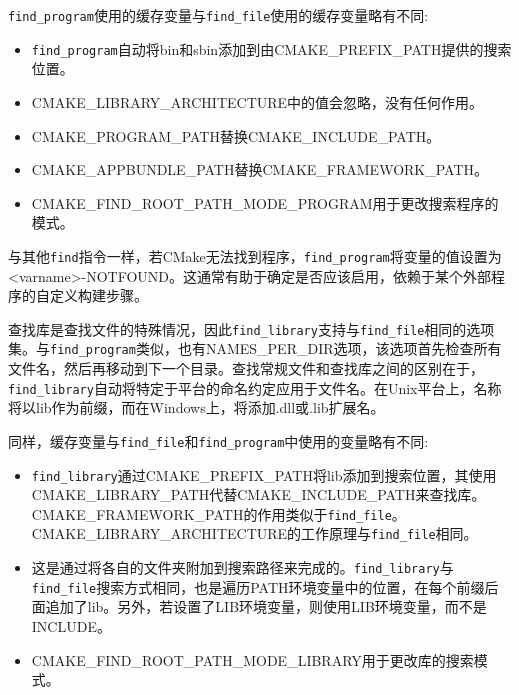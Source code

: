\texttt{find\_program}使用的缓存变量与\texttt{find\_file}使用的缓存变量略有不同:

\begin{itemize}
\item 
\texttt{find\_program}自动将bin和sbin添加到由CMAKE\_PREFIX\_PATH提供的搜索位置。

\item 
CMAKE\_LIBRARY\_ARCHITECTURE中的值会忽略，没有任何作用。

\item 
CMAKE\_PROGRAM\_PATH替换CMAKE\_INCLUDE\_PATH。

\item 
CMAKE\_APPBUNDLE\_PATH替换CMAKE\_FRAMEWORK\_PATH。

\item 
CMAKE\_FIND\_ROOT\_PATH\_MODE\_PROGRAM用于更改搜索程序的模式。
\end{itemize}

与其他\texttt{find}指令一样，若CMake无法找到程序，\texttt{find\_program}将变量的值设置为<varname>-NOTFOUND。这通常有助于确定是否应该启用，依赖于某个外部程序的自定义构建步骤。


查找库是查找文件的特殊情况，因此\texttt{find\_library}支持与\texttt{find\_file}相同的选项集。与\texttt{find\_program}类似，也有NAMES\_PER\_DIR选项，该选项首先检查所有文件名，然后再移动到下一个目录。查找常规文件和查找库之间的区别在于，\texttt{find\_library}自动将特定于平台的命名约定应用于文件名。在Unix平台上，名称将以lib作为前缀，而在Windows上，将添加.dll或.lib扩展名。

同样，缓存变量与\texttt{find\_file}和\texttt{find\_program}中使用的变量略有不同:

\begin{itemize}
\item 
\texttt{find\_library}通过CMAKE\_PREFIX\_PATH将lib添加到搜索位置，其使用CMAKE\_LIBRARY\_PATH代替CMAKE\_INCLUDE\_PATH来查找库。CMAKE\_FRAMEWORK\_PATH的作用类似于\texttt{find\_file}。CMAKE\_LIBRARY\_ARCHITECTURE的工作原理与\texttt{find\_file}相同。

\item 
这是通过将各自的文件夹附加到搜索路径来完成的。\texttt{find\_library}与\texttt{find\_file}搜索方式相同，也是遍历PATH环境变量中的位置，在每个前缀后面追加了lib。另外，若设置了LIB环境变量，则使用LIB环境变量，而不是INCLUDE。

\item 
CMAKE\_FIND\_ROOT\_PATH\_MODE\_LIBRARY用于更改库的搜索模式。
\end{itemize}

